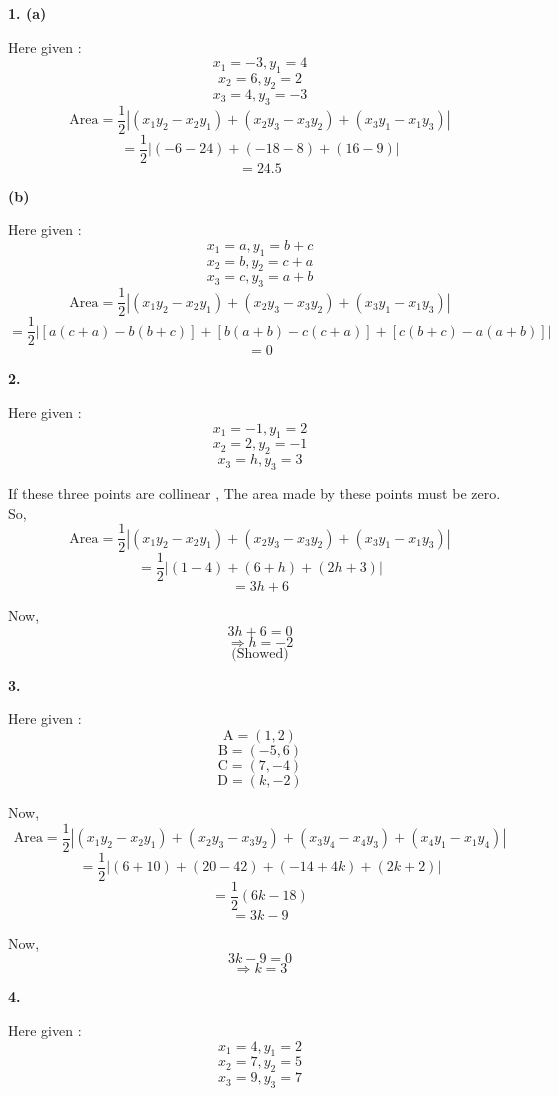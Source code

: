 \documentclass{article}
\begin{document}
\begin{flushleft}
\newpage
\textbf{1. \hspace{0.4cm}(a)}\par
\vspace{0.5cm}
 Here given : 
\[ x_1 = -3, y_1 = 4 \]
\[ x_2 = 6, y_2 = 2 \]
\[ x_3 = 4, y_3 = -3 \]
\[\text{Area} = \frac{1}{2} |(x_1y_2-x_2y_1)+(x_2y_3-x_3y_2)+(x_3y_1-x_1y_3)| \]
\[=\frac{1}{2} |(-6-24)+(-18-8)+(16-9)|\]
\[=24.5\]\par
\vspace{1cm}
\textbf{\hspace{1cm}(b)}\par
\vspace{0.5cm}
 Here given :
\[ x_1 = a, y_1 = b+c \]
\[ x_2 = b, y_2 = c+a \]
\[ x_3 = c, y_3 = a+b \]
\[\text{Area} = \frac{1}{2} |(x_1y_2-x_2y_1)+(x_2y_3-x_3y_2)+(x_3y_1-x_1y_3)| \]
\[=\frac{1}{2} |[a(c+a)-b(b+c)]+[b(a+b)-c(c+a)]+[c(b+c)-a(a+b)]|\]
\[=0\]\par
\vspace{1cm}
\textbf{2.}\par
\vspace{0.5cm}
Here given :
\[ x_1 = -1, y_1 = 2 \]
\[ x_2 = 2, y_2 = -1 \]
\[ x_3 = h, y_3 = 3 \]\par

If these three points are collinear , The area made by these points must be zero. So,
\[\text{Area} = \frac{1}{2} |(x_1y_2-x_2y_1)+(x_2y_3-x_3y_2)+(x_3y_1-x_1y_3)| \]
\[=\frac{1}{2} |(1-4)+(6+h)+(2h+3)|\]
\[=3h+6\]\par
Now,
\[3h+6=0\]
\[\Longrightarrow h=-2\]
\[\text{(Showed)}\]\par
\newpage
\textbf{3.}\par
\vspace{0.5cm}
Here given : 
\[\text{A}=(1,2)\]
\[\text{B}=(-5,6)\]
\[\text{C}=(7,-4)\]
\[\text{D}=(k,-2)\]\par
Now,
\[\text{Area} = \frac{1}{2} |(x_1y_2-x_2y_1)+(x_2y_3-x_3y_2)+(x_3y_4-x_4y_3)+(x_4y_1-x_1y_4)| \]
\[=\frac{1}{2}|(6+10)+(20-42)+(-14+4k)+(2k+2)|\]
\[=\frac{1}{2}(6k-18)\]
\[=3k-9\]\par
Now,
\[3k-9=0\]
\[\Longrightarrow k=3\]\par
\vspace{1cm}
\textbf{4.}\par
\vspace{0.5cm}
Here given : 
\[ x_1 = 4, y_1 = 2 \]
\[ x_2 = 7, y_2 = 5 \]
\[ x_3 = 9, y_3 = 7 \]\par


\end{flushleft}
\end{document}
